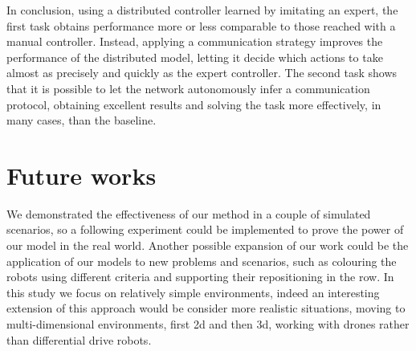 In conclusion, using a distributed controller learned by imitating an expert, the 
first task obtains performance more or less comparable to those reached with 
a manual controller. Instead, applying a communication strategy improves the 
performance of the distributed model, letting it decide which actions to take 
almost as precisely and quickly as the expert controller.
The second task shows that it is possible to let the network autonomously infer a 
communication protocol, obtaining excellent results and solving the task more 
effectively, in many cases, than the baseline.

\section{Future works}
\label{sec:future}

We demonstrated the effectiveness of our method in a couple of simulated 
scenarios, so a following experiment could be implemented to prove the power of 
our model in the real world.
Another possible expansion of our work could be the application of our models to 
new problems and scenarios, such as colouring the robots using different criteria 
and supporting their repositioning in the row.
In this study we focus on relatively simple environments, indeed an interesting 
extension of this approach would be consider more realistic situations, moving to 
multi-dimensional environments, first \gls{2d} and then \gls{3d}, working with 
drones rather than differential drive robots.
